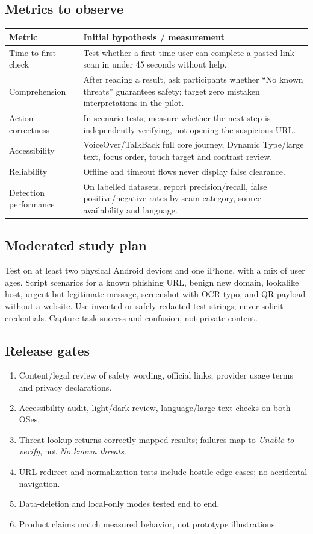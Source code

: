 \documentclass[10pt,a4paper]{article}
\begin{document}
\subsection{Metrics to observe}
\begin{tabularx}{\linewidth}{@{}p{52mm}Y@{}}\toprule
\textbf{Metric} & \textbf{Initial hypothesis / measurement} \\ \midrule
Time to first check & Test whether a first-time user can complete a pasted-link scan in under 45 seconds without help. \\
Comprehension & After reading a result, ask participants whether ``No known threats'' guarantees safety; target zero mistaken interpretations in the pilot. \\
Action correctness & In scenario tests, measure whether the next step is independently verifying, not opening the suspicious URL. \\
Accessibility & VoiceOver/TalkBack full core journey, Dynamic Type/large text, focus order, touch target and contrast review. \\
Reliability & Offline and timeout flows never display false clearance. \\
Detection performance & On labelled datasets, report precision/recall, false positive/negative rates by scam category, source availability and language. \\
\bottomrule\end{tabularx}

\subsection{Moderated study plan}
Test on at least two physical Android devices and one iPhone, with a mix of user ages. Script scenarios for a known phishing URL, benign new domain, lookalike host, urgent but legitimate message, screenshot with OCR typo, and QR payload without a website. Use invented or safely redacted test strings; never solicit credentials. Capture task success and confusion, not private content.

\subsection{Release gates}
\begin{enumerate}
\item Content/legal review of safety wording, official links, provider usage terms and privacy declarations.
\item Accessibility audit, light/dark review, language/large-text checks on both OSes.
\item Threat lookup returns correctly mapped results; failures map to \emph{Unable to verify}, not \emph{No known threats}.
\item URL redirect and normalization tests include hostile edge cases; no accidental navigation.
\item Data-deletion and local-only modes tested end to end.
\item Product claims match measured behavior, not prototype illustrations.
\end{enumerate}
\end{document}
